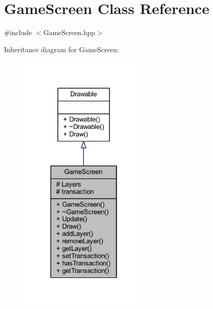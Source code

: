 \hypertarget{class_game_screen}{\section{Game\-Screen Class Reference}
\label{class_game_screen}
}


{\ttfamily \#include $<$Game\-Screen.\-hpp$>$}



Inheritance diagram for Game\-Screen\-:\nopagebreak
\begin{figure}[H]
\begin{center}
\leavevmode
\includegraphics[width=178pt]{class_game_screen__inherit__graph}
\end{center}
\end{figure}


